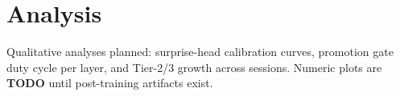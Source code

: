 \section{Analysis}
\label{sec:analysis}

Qualitative analyses planned: surprise-head calibration curves,
promotion gate duty cycle per layer, and Tier-2/3 growth across sessions.
Numeric plots are \textbf{TODO} until post-training artifacts exist.
